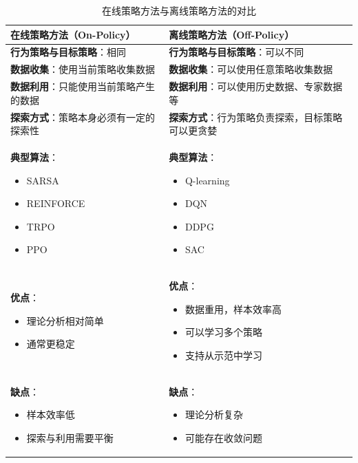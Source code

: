 \begin{table}[H]
\centering
\caption{在线策略方法与离线策略方法的对比}
\begin{tabular}{p{}p{}}
\toprule
\textbf{在线策略方法（On-Policy）} & \textbf{离线策略方法（Off-Policy）} \\
\midrule
\textbf{行为策略与目标策略}：相同 & \textbf{行为策略与目标策略}：可以不同 \\
\hline
\textbf{数据收集}：使用当前策略收集数据 & \textbf{数据收集}：可以使用任意策略收集数据 \\
\hline
\textbf{数据利用}：只能使用当前策略产生的数据 & \textbf{数据利用}：可以使用历史数据、专家数据等 \\
\hline
\textbf{探索方式}：策略本身必须有一定的探索性 & \textbf{探索方式}：行为策略负责探索，目标策略可以更贪婪 \\
\hline
\textbf{典型算法}：
\begin{itemize}
    \item SARSA
    \item REINFORCE
    \item TRPO
    \item PPO
\end{itemize} & \textbf{典型算法}：
\begin{itemize}
    \item Q-learning
    \item DQN
    \item DDPG
    \item SAC
\end{itemize} \\
\hline
\textbf{优点}：
\begin{itemize}
    \item 理论分析相对简单
    \item 通常更稳定
\end{itemize} & \textbf{优点}：
\begin{itemize}
    \item 数据重用，样本效率高
    \item 可以学习多个策略
    \item 支持从示范中学习
\end{itemize} \\
\hline
\textbf{缺点}：
\begin{itemize}
    \item 样本效率低
    \item 探索与利用需要平衡
\end{itemize} & \textbf{缺点}：
\begin{itemize}
    \item 理论分析复杂
    \item 可能存在收敛问题
\end{itemize} \\
\bottomrule
\end{tabular}
\end{table}

